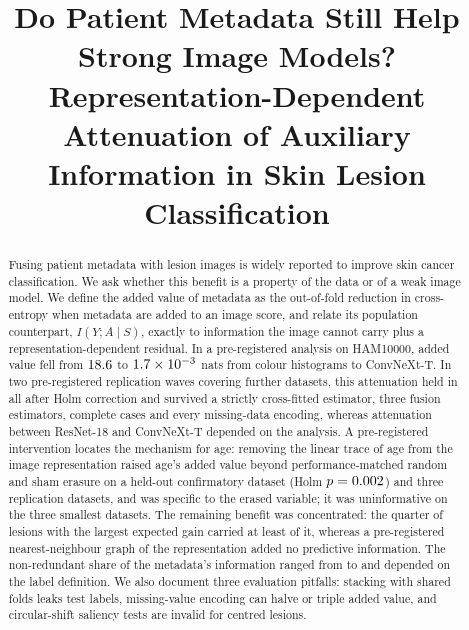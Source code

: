 \documentclass[conference]{IEEEtran}
\begin{document}
\title{Do Patient Metadata Still Help Strong Image Models?\\Representation-Dependent Attenuation of Auxiliary Information in Skin Lesion Classification}

\author{
}

\maketitle

\begin{abstract}
Fusing patient metadata with lesion images is widely reported to improve skin cancer classification. We ask whether this benefit is a property of the data or of a weak image model. We define the added value of metadata as the out-of-fold reduction in cross-entropy when metadata are added to an image score, and relate its population counterpart, $I(Y;A\mid S)$, exactly to information the image cannot carry plus a representation-dependent residual. In a pre-registered analysis on HAM10000, added value fell from $18.6$ to $1.7\times10^{-3}$ nats from colour histograms to ConvNeXt-T. In two pre-registered replication waves covering \REPindepN{} further datasets, this attenuation held in all \REPindepHone{} after Holm correction and survived a strictly cross-fitted estimator, three fusion estimators, complete cases and every missing-data encoding, whereas attenuation between ResNet-18 and ConvNeXt-T depended on the analysis. A pre-registered intervention locates the mechanism for age: removing the linear trace of age from the image representation raised age's added value beyond performance-matched random and sham erasure on a held-out confirmatory dataset (Holm $p=0.002$) and three replication datasets, and was specific to the erased variable; it was uninformative on the three smallest datasets. The remaining benefit was concentrated: the quarter of lesions with the largest expected gain carried at least \GRPcapMin{} of it, whereas a pre-registered nearest-neighbour graph of the representation added no predictive information. The non-redundant share of the metadata's information ranged from \RHOmin{} to \RHOmax{} and depended on the label definition. We also document three evaluation pitfalls: stacking with shared folds leaks test labels, missing-value encoding can halve or triple added value, and circular-shift saliency tests are invalid for centred lesions.
\end{abstract}
\end{document}
